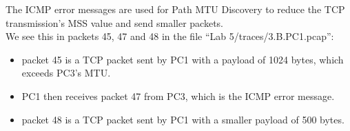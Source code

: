 The ICMP error messages are used for Path MTU Discovery to reduce the TCP transmission's MSS value and send smaller packets. \\

We see this in packets 45, 47 and 48 in the file ``Lab 5/traces/3.B.PC1.pcap'': \\
\begin{itemize}
    \item packet 45 is a TCP packet sent by PC1 with a payload of 1024 bytes, which exceeds PC3's MTU. \\
    \item PC1 then receives packet 47 from PC3, which is the ICMP error message. \\
    \item packet 48 is a TCP packet sent by PC1 with a smaller payload of 500 bytes.
\end{itemize}
